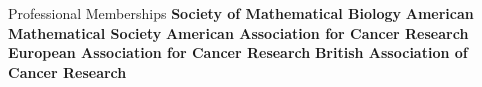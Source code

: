 \begin{rubric}{Professional Memberships}
\entry*[2023-] \textbf{Society of Mathematical Biology}
\entry*[2022-] \textbf{American Mathematical Society}
\entry*[2021-] \textbf{American Association for Cancer Research}
\entry*[2018-] \textbf{European Association for Cancer Research}
\entry*[2018-2020] \textbf{British Association of Cancer Research}
\end{rubric}